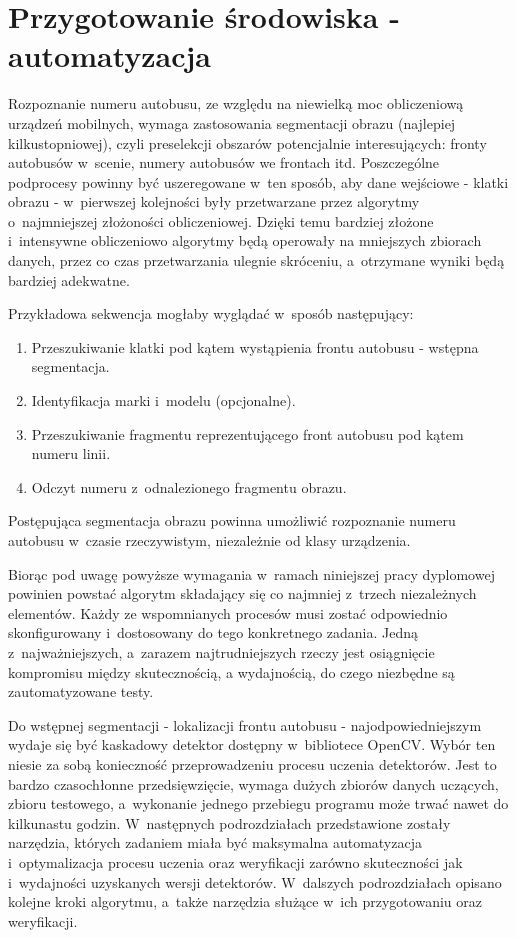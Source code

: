 \chapter{Przygotowanie środowiska - automatyzacja}

Rozpoznanie numeru autobusu, ze względu na niewielką moc obliczeniową
urządzeń mobilnych, wymaga zastosowania segmentacji obrazu 
(najlepiej kilkustopniowej), czyli preselekcji obszarów potencjalnie
interesujących: fronty autobusów w~scenie, numery autobusów
we frontach itd. Poszczególne podprocesy powinny być
uszeregowane w~ten sposób, aby dane wejściowe - klatki obrazu - 
w~pierwszej kolejności były przetwarzane przez algorytmy o~najmniejszej
złożoności obliczeniowej. Dzięki temu
bardziej złożone i~intensywne obliczeniowo algorytmy będą operowały 
na mniejszych zbiorach danych, przez co czas przetwarzania ulegnie
skróceniu, a~otrzymane wyniki będą bardziej adekwatne.

Przykładowa sekwencja mogłaby wyglądać
w~sposób następujący:

\begin{enumerate}
    \item Przeszukiwanie klatki pod kątem wystąpienia frontu autobusu -
        wstępna segmentacja.
    \item Identyfikacja marki i~modelu (opcjonalne).
    \item Przeszukiwanie fragmentu reprezentującego front autobusu
        pod kątem numeru linii.
    \item Odczyt numeru z~odnalezionego fragmentu obrazu.
\end{enumerate}

Postępująca segmentacja obrazu powinna umożliwić rozpoznanie
numeru autobusu w~czasie rzeczywistym, niezależnie od klasy urządzenia.

Biorąc pod uwagę powyższe wymagania
w~ramach niniejszej pracy dyplomowej powinien powstać algorytm 
składający się co najmniej z~trzech niezależnych elementów. 
Każdy ze wspomnianych procesów musi zostać odpowiednio skonfigurowany
i~dostosowany do tego konkretnego zadania. Jedną z~najważniejszych, 
a~zarazem najtrudniejszych rzeczy jest osiągnięcie kompromisu 
między skutecznością, a wydajnością, do czego niezbędne są 
zautomatyzowane testy.

Do wstępnej segmentacji - lokalizacji frontu autobusu - najodpowiedniejszym
wydaje się być kaskadowy detektor dostępny w~bibliotece OpenCV. 
Wybór ten niesie za sobą konieczność przeprowadzeniu procesu uczenia
detektorów. Jest to bardzo czasochłonne przedsięwzięcie, 
wymaga dużych zbiorów danych uczących, zbioru testowego, a~wykonanie
jednego przebiegu programu może trwać nawet do kilkunastu godzin. 
W~następnych podrozdziałach 
przedstawione zostały narzędzia, których
zadaniem miała być maksymalna automatyzacja i~optymalizacja procesu uczenia
oraz weryfikacji zarówno skuteczności jak i~wydajności uzyskanych wersji
detektorów. W~dalszych podrozdziałach opisano kolejne
kroki algorytmu, a~także narzędzia służące w~ich przygotowaniu oraz 
weryfikacji.

